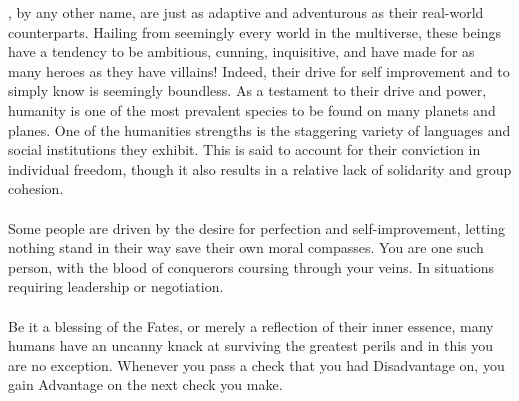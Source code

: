 %
, by any other name, are just as adaptive and adventurous as their real-world counterparts. 
Hailing from seemingly every world in the multiverse, these beings have a tendency to be ambitious, cunning, inquisitive, and have made for as many heroes as they have villains! 
Indeed, their drive for self improvement and to simply know is seemingly boundless. 
As a testament to their drive and power, humanity is one of the most prevalent species to be found on many planets and planes.
One of the humanities strengths is the staggering variety of languages and social institutions they exhibit. 
This is said to account for their conviction in individual freedom, though it also results in a relative lack of solidarity and group cohesion.
\\\\
 Some people are driven by the desire for perfection and self-improvement, letting nothing stand in their way save their own moral compasses. You are one such person, with the blood of conquerors coursing through your veins. In situations requiring leadership or negotiation.
\\\\
 Be it a blessing of the Fates, or merely a reflection of their inner essence, many humans have an uncanny knack at surviving the greatest perils and in this you are no exception. Whenever you pass a check that you had Disadvantage on, you gain Advantage on the next check you make.
%
\pagebreak\\
%
%
